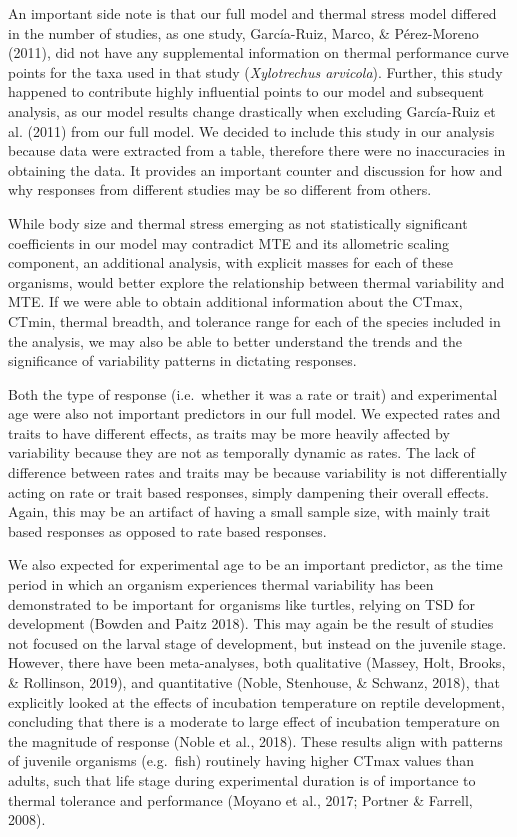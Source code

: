 \documentclass[12pt,twoside]{reedthesis}
\begin{document}
An important side note is that our full model and thermal stress model differed in the number of studies, as one study, García-Ruiz, Marco, \& Pérez-Moreno (2011), did not have any supplemental information on thermal performance curve points for the taxa used in that study (\emph{Xylotrechus arvicola}). Further, this study happened to contribute highly influential points to our model and subsequent analysis, as our model results change drastically when excluding García-Ruiz et al. (2011) from our full model. We decided to include this study in our analysis because data were extracted from a table, therefore there were no inaccuracies in obtaining the data. It provides an important counter and discussion for how and why responses from different studies may be so different from others.

While body size and thermal stress emerging as not statistically significant coefficients in our model may contradict MTE and its allometric scaling component, an additional analysis, with explicit masses for each of these organisms, would better explore the relationship between thermal variability and MTE. If we were able to obtain additional information about the CTmax, CTmin, thermal breadth, and tolerance range for each of the species included in the analysis, we may also be able to better understand the trends and the significance of variability patterns in dictating responses.

Both the type of response (i.e.~whether it was a rate or trait) and experimental age were also not important predictors in our full model. We expected rates and traits to have different effects, as traits may be more heavily affected by variability because they are not as temporally dynamic as rates. The lack of difference between rates and traits may be because variability is not differentially acting on rate or trait based responses, simply dampening their overall effects. Again, this may be an artifact of having a small sample size, with mainly trait based responses as opposed to rate based responses.

We also expected for experimental age to be an important predictor, as the time period in which an organism experiences thermal variability has been demonstrated to be important for organisms like turtles, relying on TSD for development (Bowden and Paitz 2018). This may again be the result of studies not focused on the larval stage of development, but instead on the juvenile stage. However, there have been meta-analyses, both qualitative (Massey, Holt, Brooks, \& Rollinson, 2019), and quantitative (Noble, Stenhouse, \& Schwanz, 2018), that explicitly looked at the effects of incubation temperature on reptile development, concluding that there is a moderate to large effect of incubation temperature on the magnitude of response (Noble et al., 2018). These results align with patterns of juvenile organisms (e.g.~fish) routinely having higher CTmax values than adults, such that life stage during experimental duration is of importance to thermal tolerance and performance (Moyano et al., 2017; Portner \& Farrell, 2008).
\end{document}
